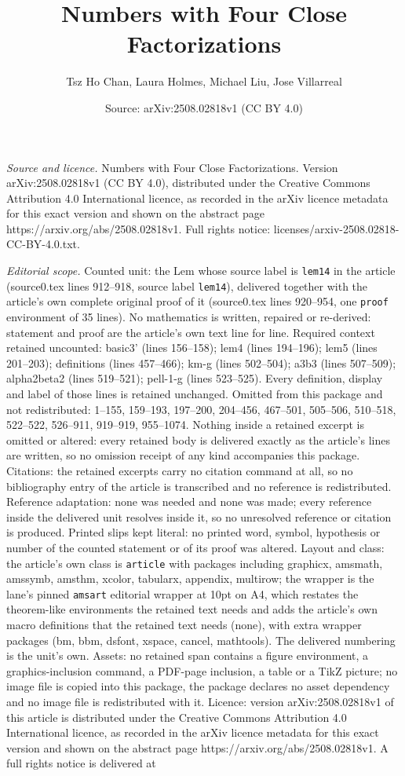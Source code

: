 \documentclass[10pt,a4paper]{amsart}
\title[Numbers with Four Close Factorizations]{Numbers with Four Close Factorizations}
\author{Tsz Ho Chan, Laura Holmes, Michael Liu, Jose Villarreal}
\date{Source: arXiv:2508.02818v1 (CC BY 4.0)}
\begin{document}
\maketitle

\noindent\emph{Source and licence.} Numbers with Four Close Factorizations. Version arXiv:2508.02818v1 (CC BY 4.0), distributed under the Creative Commons Attribution 4.0 International licence, as recorded in the arXiv licence metadata for this exact version and shown on the abstract page https://arxiv.org/abs/2508.02818v1. Full rights notice: licenses/arxiv-2508.02818-CC-BY-4.0.txt.\par\smallskip

\noindent\textit{Editorial scope.} Counted unit: the Lem whose source label is \texttt{lem14} in the article (source0.tex lines 912--918, source label \texttt{lem14}), delivered together with the article's own complete original proof of it (source0.tex lines 920--954, one \texttt{proof} environment of 35 lines). No mathematics is written, repaired or re-derived: statement and proof are the article's own text line for line. Required context retained uncounted: basic3' (lines 156--158); lem4 (lines 194--196); lem5 (lines 201--203); definitions (lines 457--466); km-g (lines 502--504); a3b3 (lines 507--509); alpha2beta2 (lines 519--521); pell-1-g (lines 523--525). Every definition, display and label of those lines is retained unchanged. Omitted from this package and not redistributed: 1--155, 159--193, 197--200, 204--456, 467--501, 505--506, 510--518, 522--522, 526--911, 919--919, 955--1074. Nothing inside a retained excerpt is omitted or altered: every retained body is delivered exactly as the article's lines are written, so no omission receipt of any kind accompanies this package. Citations: the retained excerpts carry no citation command at all, so no bibliography entry of the article is transcribed and no reference is redistributed. Reference adaptation: none was needed and none was made; every reference inside the delivered unit resolves inside it, so no unresolved reference or citation is produced. Printed slips kept literal: no printed word, symbol, hypothesis or number of the counted statement or of its proof was altered. Layout and class: the article's own class is \texttt{article} with packages including graphicx, amsmath, amssymb, amsthm, xcolor, tabularx, appendix, multirow; the wrapper is the lane's pinned \texttt{amsart} editorial wrapper at 10pt on A4, which restates the theorem-like environments the retained text needs and adds the article's own macro definitions that the retained text needs (none), with extra wrapper packages (bm, bbm, dsfont, xspace, cancel, mathtools). The delivered numbering is the unit's own. Assets: no retained span contains a figure environment, a graphics-inclusion command, a PDF-page inclusion, a table or a TikZ picture; no image file is copied into this package, the package declares no asset dependency and no image file is redistributed with it. Licence: version arXiv:2508.02818v1 of this article is distributed under the Creative Commons Attribution 4.0 International licence, as recorded in the arXiv licence metadata for this exact version and shown on the abstract page https://arxiv.org/abs/2508.02818v1. A full rights notice is delivered at 
\end{document}

